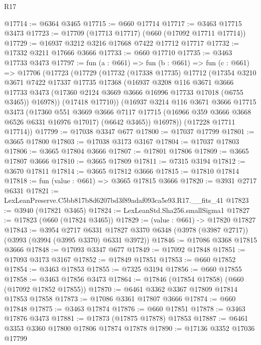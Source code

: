 \begin{lexlean}{R17}
\begin{coremodule}
@17714 := @6364 @3465
@17715 := @660 @17714
@17717 := @3463 @17715 @3473
@17723 := @17709 (@17713 @17717) (@660 (@17092 @17711 @17714))
@17729 := @16937 @3212 @3216 @17668 @7422 @17712 @17717
@17732 := @17332 @3211 @17666 @3666
@17733 := @660 @17710
@17735 := @3463 @17733 @3473
@17797 := fun (a : @661) =>
  fun (b : @661) =>
  fun (c : @661) =>
  @17706
    (@17723
      (@17729
        (@17732
          (@17338 @17735)
          @17712
          (@17354
            @3210
            @3671
            @7422
            @17337
            @17735
            @17368
            (@16937
              @3208
              @116
              @3671
              @3666
              @17733
              @3473
              (@17360 @2124 @3669 @3666 @16996 @17733 @17018 (@6755 @3465))
              @16978))
          (@17418 @17710))
        (@16937
          @3214
          @116
          @3671
          @3666
          @17715
          @3473
          (@17360
            @551
            @3669
            @3666
            @7117
            @17715
            (@16966 @359 @3666 @3668 @6526 @6331 @16976 @17017)
            (@6642 @3465))
          @16978))
      (@17228 @17711 @17714))
@17799 := @17038 @3347 @677
@17800 := @17037 @17799
@17801 := @3665 @17800
@17803 := @17038 @3173 @3167
@17804 := @17037 @17803
@17806 := @3665 @17804 @3666
@17807 := @17801 @17806
@17809 := @3665 @17807 @3666
@17810 := @3665 @17809
@17811 := @7315 @3194
@17812 := @3670 @17811
@17814 := @3665 @17812 @3666
@17815 := @17810 @17814
@17818 := fun (value : @661) => @3665 @17815 @3666
@17820 := @3931 @2717 @6331
@17821 := LexLeanPreserve.C5bb817b8d6207bd3f89adaf093ca5e93.R17.__fits_41
@17823 := @3940 (@17821 @3465)
@17824 := LexLeanStd.Sha256.smallSigma1
@17827 := @17823 (@660 (@17824 @3465))
@17829 := (value : @661) -> @17820 @17827
@17843 := @3954
    @2717
    @6331
    @17827
    @3370
    @6348
    (@3978 (@3987 @2717))
    (@3993 (@3994 (@3995 @3370) @6331 @3972))
@17846 := @17086 @3368 @17815 @3666
@17848 := @17093 @3347 @677
@17849 := @17092 @17848
@17851 := @17093 @3173 @3167
@17852 := @17849 @17851
@17853 := @660 @17852
@17854 := @3463 @17853
@17855 := @7325 @3194
@17856 := @660 @17855
@17858 := @3463 @17856 @3473
@17864 := @17846 (@17854 @17858) (@660 (@17092 @17852 @17855))
@17870 := @6461 @3362 @3367 @17809 @17814 @17853 @17858
@17873 := @17086 @3361 @17807 @3666
@17874 := @660 @17848
@17875 := @3463 @17874
@17876 := @660 @17851
@17878 := @3463 @17876 @3473
@17881 := @17873 (@17875 @17878) @17853
@17887 := @6461 @3353 @3360 @17800 @17806 @17874 @17878
@17890 := @17136 @3352 @17036 @17799

\end{coremodule}
\end{lexlean}
